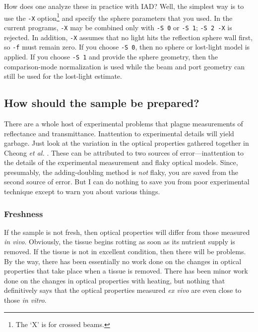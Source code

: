 \documentclass{article}
\begin{document}
How does one analyze these in practice with IAD?  Well, the simplest way is to
use the \texttt{-X} option\footnote{The `X' is for crossed beams.} and specify
the sphere parameters that you used.  In the current programs, \texttt{-X} may be
combined only with \texttt{-S 0} or \texttt{-S 1}; \texttt{-S 2 -X} is rejected.
In addition, \texttt{-X} assumes that no light hits the reflection sphere wall
first, so \texttt{-f} must remain zero.  If you choose \texttt{-S 0}, then no
sphere or lost-light model is applied.  If you choose \texttt{-S 1} and provide
the sphere geometry, then the comparison-mode normalization is used while the
beam and port geometry can still be used for the lost-light estimate.

\subsection{How should the sample be prepared?}

There are a whole host of experimental problems that plague measurements
of reflectance and transmittance.  Inattention to experimental details will yield
garbage.  Just look at the variation in the optical properties
gathered together in Cheong \emph{et al.} \cite{cheong90a}.  These can be attributed
to two sources of error---inattention to the details of the experimental
measurement and flaky optical models.  Since, presumably, the adding-doubling
method is \textit{not} flaky, you are saved from the second source of error.  
But I can do nothing to save you from poor experimental technique
except to warn you about various things.  

\subsubsection{Freshness}
If the sample is not fresh, then optical properties will differ from those
measured {\it in vivo}.  Obviously, the tissue begins rotting as soon as
its nutrient supply is removed. If the tissue is not in excellent condition, then
there will be problems.  By the way, there has been essentially no work
done on the changes in optical properties that take place when a tissue
is removed.  There has been minor work done on the changes in optical
properties with heating, but nothing that definitively says that the
optical properties measured \textit{ex vivo} are even close to those 
\textit{in vitro}.  
\end{document}
